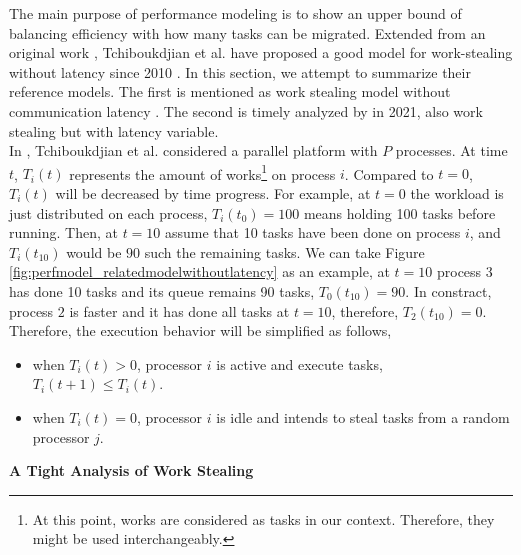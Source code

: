 The main purpose of performance modeling is to show an upper bound of balancing efficiency with how many tasks can be migrated. Extended from an original work \cite{Blumofe1999OriginWS}, Tchiboukdjian et al. have proposed a good model for work-stealing without latency since 2010 \cite{tchiboukdjian2010tighter} \cite{tchiboukdjian2013decentralized}. In this section, we attempt to summarize their reference models. The first is mentioned as work stealing model without communication latency \cite{tchiboukdjian2010tighter} \cite{tchiboukdjian2013decentralized}. The second is timely analyzed by \cite{gast2021analysis} in 2021, also work stealing but with latency variable.\\

In \cite{tchiboukdjian2013decentralized}, Tchiboukdjian et al. considered a parallel platform with $P$ processes. At time $t$, $T_{i}(t)$ represents the amount of works\footnote{At this point, works are considered as tasks in our context. Therefore, they might be used interchangeably.} on process $i$. Compared to $t=0$, $T_{i}(t)$ will be decreased by time progress. For example, at $t=0$ the workload is just distributed on each process, $T_{i}(t_{0}) = 100$ means holding 100 tasks before running. Then, at $t=10$ assume that 10 tasks have been done on process $i$, and $T_{i}(t_{10})$ would be $90$ such the remaining tasks. We can take Figure \ref{fig:perfmodel_relatedmodelwithoutlatency} as an example, at $t=10$ process $3$ has done 10 tasks and its queue remains 90 tasks, $T_{0}(t_{10}) = 90$. In constract, process $2$ is faster and it has done all tasks at $t=10$, therefore, $T_{2}(t_{10}) = 0$.\\

Therefore, the execution behavior will be simplified as follows,
\begin{itemize}
	\item when $T_{i}(t) > 0$, processor $i$ is active and execute tasks, $T_{i}(t+1) \leq T_{i}(t)$.
	\item when $T_{i}(t) = 0$, processor $i$ is idle and intends to steal tasks from a random processor $j$.
\end{itemize}

\noindent \textbf{A Tight Analysis of Work Stealing \cite{tchiboukdjian2010tighter,tchiboukdjian2013decentralized}}\\

